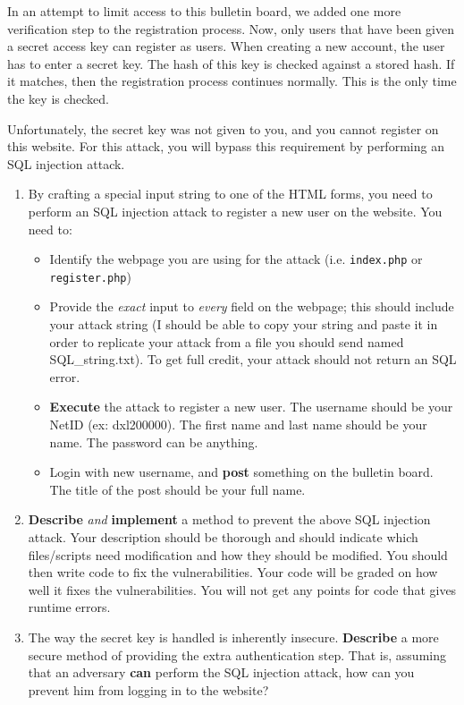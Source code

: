 \documentclass[]{article}
\begin{document}
In an attempt to limit access to this bulletin board, we added one more verification step to the registration process. Now, only users that have been given a secret access key can register as users. When creating a new account, the user has to enter a secret key. The hash of this key is checked against a stored hash. If it matches, then the registration process continues normally. This is the only time the key is checked.

Unfortunately, the secret key was not given to you, and you cannot register on this website. For this attack, you will bypass this requirement by performing an SQL injection attack.

\begin{enumerate}
	\item By crafting a special input string to one of the HTML forms, you need to perform an SQL injection attack to register a new user on the website. You need to:
		\begin{itemize}
			\item Identify the webpage you are using for the attack (i.e. \verb"index.php" or \verb"register.php")
			\item Provide the \emph{exact} input to \emph{every} field on the webpage; this should include your attack string (I should be able to copy your string and paste it in order to replicate your attack from a file you should send named SQL\_string.txt). To get full credit, your attack should not return an SQL error.
			\item \textbf{Execute} the attack to register a new user. The username should be your NetID (ex: dxl200000). The first name and last name should be your name. The password can be anything.

			\item Login with new username, and \textbf{post} something on the bulletin board. The title of the post should be your full name.

		\end{itemize}

	\item \textbf{Describe} \emph{and} \textbf{implement} a method to prevent the above SQL injection attack. Your description should be thorough and should indicate which files/scripts need modification and how they should be modified. You should then write code to fix the vulnerabilities. Your code will be graded on how well it fixes the vulnerabilities. You will not get any points for code that gives runtime errors.

	\item The way the secret key is handled is inherently insecure. \textbf{Describe} a more secure method of providing the extra authentication step. That is, assuming that an adversary \textbf{can} perform the SQL injection attack, how can you prevent him from logging in to the website?

\end{enumerate}
\end{document}
